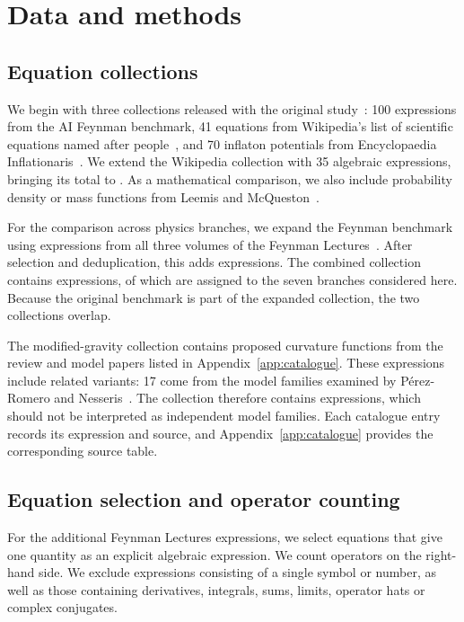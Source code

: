 \documentclass[10pt]{article}
\begin{document}
\section{Data and methods}\label{sec:data}

\subsection{Equation collections}
We begin with three collections released with the original study~\citep{constantin2024}: 100 expressions from the AI Feynman benchmark, 41 equations from Wikipedia's list of scientific equations named after people~\citep{wikinamed}, and 70 inflaton potentials from Encyclopaedia Inflationaris~\citep{martin2014}. We extend the Wikipedia collection with 35 algebraic expressions, bringing its total to \nWiki{}. As a mathematical comparison, we also include \nLeemis{} probability density or mass functions from Leemis and McQueston~\citep{leemis2008}.

For the comparison across physics branches, we expand the Feynman benchmark using expressions from all three volumes of the Feynman Lectures~\citep{feynman}. After selection and deduplication, this adds \nLectAdded{} expressions. The combined collection contains \nFeynAll{} expressions, of which \nLabelled{} are assigned to the seven branches considered here. Because the original benchmark is part of the expanded collection, the two collections overlap.

The modified-gravity collection contains \nfR{} proposed curvature functions from the review and model papers listed in Appendix~\ref{app:catalogue}. These expressions include related variants: 17 come from the model families examined by P\'erez-Romero and Nesseris~\citep{perezromero2018}. The collection therefore contains \nfR{} expressions, which should not be interpreted as \nfR{} independent model families. Each catalogue entry records its expression and source, and Appendix~\ref{app:catalogue} provides the corresponding source table.

\subsection{Equation selection and operator counting}
For the additional Feynman Lectures expressions, we select equations that give one quantity as an explicit algebraic expression. We count operators on the right-hand side. We exclude expressions consisting of a single symbol or number, as well as those containing derivatives, integrals, sums, limits, operator hats or complex conjugates.
\end{document}
